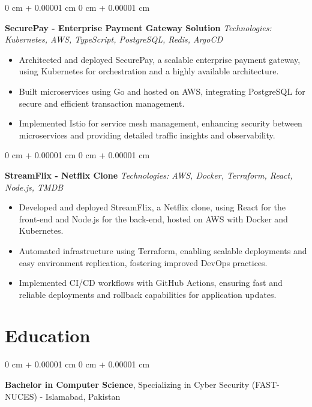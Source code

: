 \documentclass[10pt, letterpaper]{article}
\newenvironment{highlights}{
    \begin{itemize}[
        topsep=0.10 cm,
        parsep=0.10 cm,
        partopsep=0pt,
        itemsep=0pt,
        leftmargin=0 cm + 10pt
    ]
}{
    \end{itemize}
}
\newenvironment{onecolentry}{
    \begin{adjustwidth}{
        0 cm + 0.00001 cm
    }{
        0 cm + 0.00001 cm
    }
}{
    \end{adjustwidth}
}
\newenvironment{twocolentry}[2][]{
    \onecolentry
    \def\secondColumn{#2}
    \setcolumnwidth{\fill, 4.5 cm}
    \begin{paracol}{2}
}{
    \switchcolumn \raggedleft \secondColumn
    \end{paracol}
    \endonecolentry
}
\begin{document}
\begin{onecolentry}
    \textbf{SecurePay - Enterprise Payment Gateway Solution}
    \textit{Technologies: Kubernetes, AWS, TypeScript, PostgreSQL, Redis, ArgoCD}
    \begin{highlights}
        \item Architected and deployed SecurePay, a scalable enterprise payment gateway, using Kubernetes for orchestration and a highly available architecture.
        \item Built microservices using Go and hosted on AWS, integrating PostgreSQL for secure and efficient transaction management.
        \item Implemented Istio for service mesh management, enhancing security between microservices and providing detailed traffic insights and observability.
    \end{highlights}
\end{onecolentry}
\vspace{0.10 cm}

\begin{onecolentry}
    \textbf{StreamFlix - Netflix Clone}
    \textit{Technologies: AWS, Docker, Terraform, React, Node.js, TMDB}
    \begin{highlights}
        \item Developed and deployed StreamFlix, a Netflix clone, using React for the front-end and Node.js for the back-end, hosted on AWS with Docker and Kubernetes.
        \item Automated infrastructure using Terraform, enabling scalable deployments and easy environment replication, fostering improved DevOps practices.
        \item Implemented CI/CD workflows with GitHub Actions, ensuring fast and reliable deployments and rollback capabilities for application updates.
    \end{highlights}
\end{onecolentry}

\section{Education}
\vspace{0.10 cm}
\begin{twocolentry}{}
    \textbf{Bachelor in Computer Science}, Specializing in Cyber Security (FAST-NUCES) - Islamabad, Pakistan
\end{twocolentry}

\end{document}

